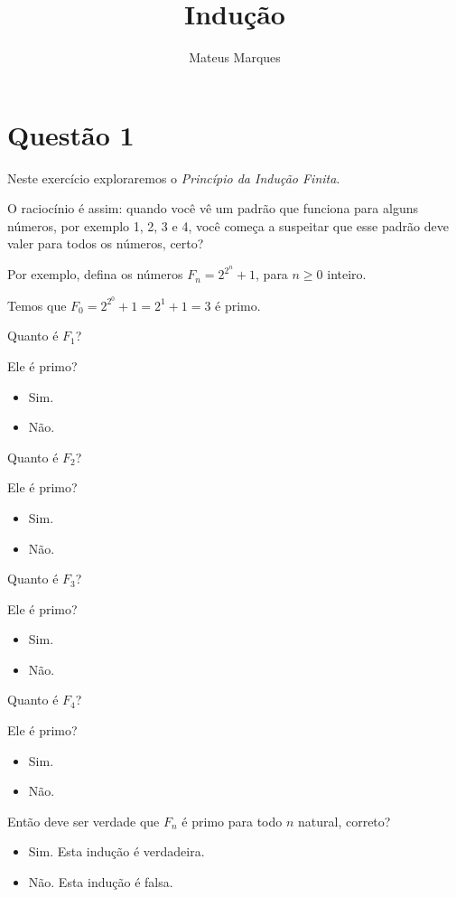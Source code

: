 \documentclass[a4paper,fleqn,12pt]{article}
\title{\Huge{\textbf{Indução}}}
\author{Mateus Marques}
\begin{document}
\maketitle

\section{Questão 1}


Neste exercício exploraremos o \textit{Princípio da Indução Finita}.

O raciocínio é assim: quando você vê um padrão que funciona para alguns números, por exemplo 1, 2, 3 e 4, você começa a suspeitar que esse padrão deve valer para todos os números, certo?

Por exemplo, defina os números $F_n = 2^{2^n} + 1$, para $n \geq 0$ inteiro.

Temos que $F_0 = 2^{2^0} + 1 = 2^1 + 1 = 3$ é primo.

\n

Quanto é $F_1$?

Ele é primo?
\begin{itemize}
\item Sim.
\item Não.
\end{itemize}

\n

Quanto é $F_2$?

Ele é primo?
\begin{itemize}
\item Sim.
\item Não.
\end{itemize}

\n

Quanto é $F_3$?

Ele é primo?
\begin{itemize}
\item Sim.
\item Não.
\end{itemize}

\n

Quanto é $F_4$?

Ele é primo?
\begin{itemize}
\item Sim.
\item Não.
\end{itemize}

\n

Então deve ser verdade que $F_n$ é primo para todo $n$ natural, correto?
\begin{itemize}
\item Sim. Esta indução é verdadeira.
\item Não. Esta indução é falsa.
\end{itemize}
\end{document}
